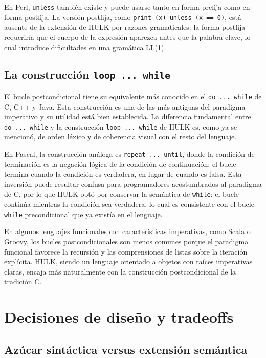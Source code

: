 \documentclass[12pt, a4paper]{article}
\begin{document}
En Perl, \texttt{unless} también existe y puede usarse tanto en forma prefija como en forma postfija. La versión postfija, como \texttt{print~(x)~unless~(x~==~0)}, está ausente de la extensión de HULK por razones gramaticales: la forma postfija requeriría que el cuerpo de la expresión aparezca antes que la palabra clave, lo cual introduce dificultades en una gramática LL(1).

\subsection{La construcción \texttt{loop ... while}}

El bucle postcondicional tiene su equivalente más conocido en el \texttt{do~...~while} de C, C++ y Java. Esta construcción es una de las más antiguas del paradigma imperativo y su utilidad está bien establecida. La diferencia fundamental entre \texttt{do~...~while} y la construcción \texttt{loop~...~while} de HULK es, como ya se mencionó, de orden léxico y de coherencia visual con el resto del lenguaje.

En Pascal, la construcción análoga es \texttt{repeat~...~until}, donde la condición de terminación es la negación lógica de la condición de continuación: el bucle termina cuando la condición es verdadera, en lugar de cuando es falsa. Esta inversión puede resultar confusa para programadores acostumbrados al paradigma de C, por lo que HULK optó por conservar la semántica de \texttt{while}: el bucle continúa mientras la condición sea verdadera, lo cual es consistente con el bucle \texttt{while} precondicional que ya existía en el lenguaje.

En algunos lenguajes funcionales con características imperativas, como Scala o Groovy, los bucles postcondicionales son menos comunes porque el paradigma funcional favorece la recursión y las comprensiones de listas sobre la iteración explícita. HULK, siendo un lenguaje orientado a objetos con raíces imperativas claras, encaja más naturalmente con la construcción postcondicional de la tradición C.

\section{Decisiones de diseño y tradeoffs}

\subsection{Azúcar sintáctica versus extensión semántica}
\end{document}

